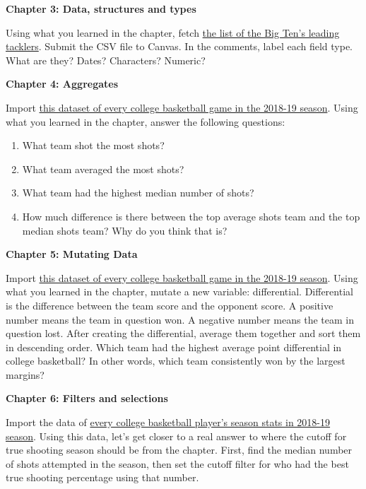 \documentclass[
]{book}
\providecommand{\tightlist}{%
  \setlength{\itemsep}{0pt}\setlength{\parskip}{0pt}}
\begin{document}
\textbf{Chapter 3: Data, structures and types}

Using what you learned in the chapter, fetch \href{http://www.cfbstats.com/2018/leader/827/player/split01/category19/sort01.html}{the list of the Big Ten's leading tacklers}. Submit the CSV file to Canvas. In the comments, label each field type. What are they? Dates? Characters? Numeric?

\textbf{Chapter 4: Aggregates}

Import \href{https://unl.box.com/s/a8m91bro10t89watsyo13yjegb1fy009}{this dataset of every college basketball game in the 2018-19 season}. Using what you learned in the chapter, answer the following questions:

\begin{enumerate}
\def\labelenumi{\arabic{enumi}.}
\tightlist
\item
  What team shot the most shots?
\item
  What team averaged the most shots?
\item
  What team had the highest median number of shots?
\item
  How much difference is there between the top average shots team and the top median shots team? Why do you think that is?
\end{enumerate}

\textbf{Chapter 5: Mutating Data}

Import \href{https://unl.box.com/s/a8m91bro10t89watsyo13yjegb1fy009}{this dataset of every college basketball game in the 2018-19 season}. Using what you learned in the chapter, mutate a new variable: differential. Differential is the difference between the team score and the opponent score. A positive number means the team in question won. A negative number means the team in question lost. After creating the differential, average them together and sort them in descending order. Which team had the highest average point differential in college basketball? In other words, which team consistently won by the largest margins?

\textbf{Chapter 6: Filters and selections}

Import the data of \href{https://unl.box.com/s/s1wzw61u9ia50qmirfhuvprgpmmah9rj}{every college basketball player's season stats in 2018-19 season}. Using this data, let's get closer to a real answer to where the cutoff for true shooting season should be from the chapter. First, find the median number of shots attempted in the season, then set the cutoff filter for who had the best true shooting percentage using that number.
\end{document}
